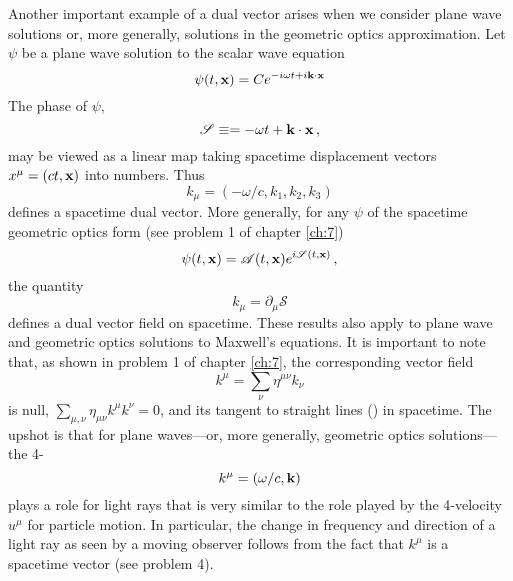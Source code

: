 Another important example of a dual vector arises when we consider plane wave solutions or, more generally, solutions in the geometric optics approximation. Let $\psi$ be a plane wave solution to the scalar wave equation
\begin{equation}\label{eq:8.20}
\psi(t, \vb{x}) = C e^{-i \omega t + i \vb{k} \cdot \vb{x}}   
\end{equation}
The phase of $\psi$, 
\begin{equation}\label{eq:8.21}
\mathscr{S} \equiv = -\omega t + \vb{k} \cdot \vb{x}\,,
\end{equation}
may be viewed as a linear map taking spacetime displacement vectors $x^\mu = (ct, \vb{x})$ into numbers. Thus
\begin{equation}\label{eq:8.22}
k_\mu = (-\omega/c, k_1, k_2, k_3)
\end{equation}
defines a spacetime dual vector. More generally, for any $\psi$ of the spacetime geometric optics form (see problem 1 of chapter \ref{ch:7})
\begin{equation}\label{eq:8.23}
\psi(t, \vb{x}) = \mathscr{A}(t, \vb{x}) e^{i \mathscr{S}(t, \vb{x})}\,,
\end{equation}
the quantity 
\begin{equation}\label{eq:8.24}
k_\mu = \partial_\mu \mathscr{S}
\end{equation}
defines a dual vector field on spacetime. These results also apply to plane wave and geometric optics solutions to Maxwell's equations. It is important to note that, as shown in problem 1 of chapter \ref{ch:7}, the corresponding vector field 
\begin{equation}\label{eq:8.25}
k^\mu = \sum_\nu \eta^{\mu \nu} k_\nu
\end{equation}
is null, $\sum_{\mu,\nu} \eta_{\mu \nu} k^\mu k^\nu = 0$, and its tangent to straight lines () in spacetime. The upshot is that for plane waves---or, more generally, geometric optics solutions---the  4-
\begin{equation}\label{eq:8.26}
k^\mu = (\omega/c, \vb{k})
\end{equation}
plays a role for light rays that is very similar to the role played by the 4-velocity $u^\mu$ for particle motion. In particular, the change in frequency and direction of a light ray as seen by a moving observer follows from the fact that $k^\mu$ is a spacetime vector (see problem 4). 

